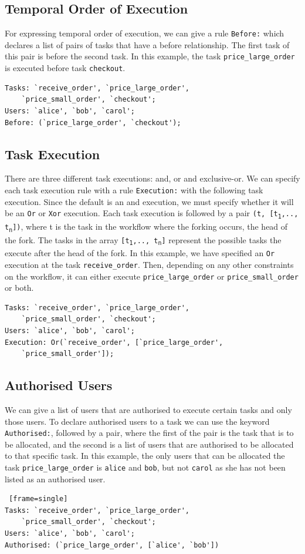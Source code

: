 \documentclass[a4paper]{report}
\begin{document}
\subsection{Temporal Order of Execution}
For expressing temporal order of execution, we can give a rule \texttt{Before:} which declares a list of pairs of tasks that have a before relationship. The first task of this pair is before the second task. In this example, the task \texttt{price\_large\_order} is executed before task \texttt{checkout}.
\begin{lstlisting}[frame=single]
Tasks: `receive_order', `price_large_order', 
	`price_small_order', `checkout'; 
Users: `alice', `bob', `carol';
Before: (`price_large_order', `checkout');
\end{lstlisting}

\subsection{Task Execution}
There are three different task executions: and, or and exclusive-or. We can specify each task execution rule with a rule \texttt{Execution:} with the following task execution. Since the default is an and execution, we must specify whether it will be an \texttt{Or} or \texttt{Xor} execution. Each task execution is followed by a pair \texttt{(t, [t\textsubscript{1},.., t\textsubscript{n}])}, where t is the task in the workflow where the forking occurs, the head of the fork. The tasks in the array \texttt{[t\textsubscript{1},.., t\textsubscript{n}]} represent the possible tasks the execute after the head of the fork. In this example, we have specified an \texttt{Or} execution at the task \texttt{receive\_order}. Then, depending on any other constraints on the workflow, it can either execute \texttt{price\_large\_order} or \texttt{price\_small\_order} or both.
\begin{lstlisting}[frame=single]
Tasks: `receive_order', `price_large_order', 
	`price_small_order', `checkout'; 
Users: `alice', `bob', `carol';
Execution: Or(`receive_order', [`price_large_order', 
	`price_small_order']);
\end{lstlisting}

\subsection{Authorised Users}
We can give a list of users that are authorised to execute certain tasks and only those users. To declare authorised users to a task we can use the keyword \texttt{Authorised:}, followed by a pair, where the first of the pair is the task that is to be allocated, and the second is a list of users that are authorised to be allocated to that specific task. In this example, the only users that can be allocated the task \texttt{price\_large\_order} is \texttt{alice} and \texttt{bob}, but not \texttt{carol} as she has not been listed as an authorised user.
\begin{lstlisting} [frame=single]
Tasks: `receive_order', `price_large_order',
	`price_small_order', `checkout'; 
Users: `alice', `bob', `carol';
Authorised: (`price_large_order', [`alice', `bob'])
\end{lstlisting}
\end{document}
